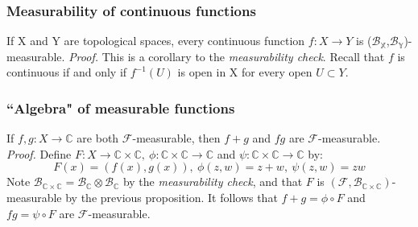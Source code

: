 \documentclass{article}
\begin{document}
\subsubsection{Measurability of continuous functions}
If X and Y are topological spaces, every continuous function $f:X\to Y$ is ($\mathcal{B}_{\mathbb{X}}$,$\mathcal{B}_{\mathbb{Y}}$)-measurable.\newline \newline
\textit{Proof.}\newline \newline
This is a corollary to the \emph{measurability check}. Recall that $f$ is continuous if and only if $f^{-1}(U)$ is open in X for every open $U \subset Y$.

\subsubsection{``Algebra" of measurable functions}
If $f,g:X\to\mathbb{C}$ are both $\mathcal{F}$-measurable, then $f+g$ and $fg$ are $\mathcal{F}$-measurable. \newline \newline
\textit{Proof.}\newline \newline
Define $F:X\to \mathbb{C}\times\mathbb{C}, \ \phi:\mathbb{C}\times\mathbb{C}\to\mathbb{C}$ and $\psi:\mathbb{C}\times\mathbb{C}\to\mathbb{C}$ by:
\[
F(x)=(f(x),g(x)), \ \phi(z,w) = z+w, \ \psi(z,w) = zw
\]
Note $\mathcal{B}_{\mathbb{C}\times\mathbb{C}}=\mathcal{B}_{\mathbb{C}}\otimes\mathcal{B}_{\mathbb{C}}$ by the \emph{measurability check}, and that $F$ is $(\mathcal{F},\mathcal{B}_{\mathbb{C}\times\mathbb{C}})$-measurable by the previous proposition. It follows that $f+g=\phi\circ F$ and $fg=\psi\circ F$ are $\mathcal{F}$-measurable.
\end{document}
